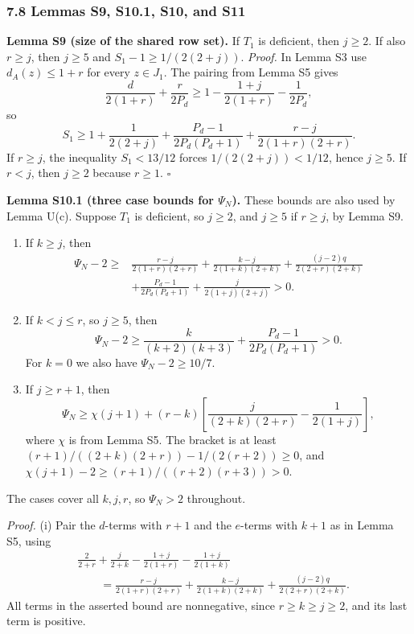 \subsubsection*{7.8 Lemmas S9, S10.1, S10, and S11}
\textbf{Lemma S9 (size of the shared row set).} If $T_1$ is deficient, then $j\ge2$. If also $r\ge j$, then $j\ge5$ and $S_1-1\ge1/(2(2+j))$.
\emph{Proof.} In Lemma S3 use $d_A(z)\le1+r$ for every $z\in J_1$. The pairing from Lemma S5 gives
\[
 \frac d{2(1+r)}+\frac r{2P_d}\ge1-\frac{1+j}{2(1+r)}-\frac1{2P_d},
\]
so
\[
 S_1\ge1+\frac1{2(2+j)}+\frac{P_d-1}{2P_d(P_d+1)}
                   +\frac{r-j}{2(1+r)(2+r)}.
\]
If $r\ge j$, the inequality $S_1<13/12$ forces $1/(2(2+j))<1/12$, hence $j\ge5$. If $r<j$, then $j\ge2$ because $r\ge1$. \hfill$\square$

\textbf{Lemma S10.1 (three case bounds for $\Psi_N$).} These bounds are also used by Lemma U(c). Suppose $T_1$ is deficient, so $j\ge2$, and $j\ge5$ if $r\ge j$, by Lemma S9.
\begin{enumerate}
\item[(i)] If $k\ge j$, then
\[
\begin{aligned}
 \Psi_N-2\ge{}&\frac{r-j}{2(1+r)(2+r)}+\frac{k-j}{2(1+k)(2+k)}
              +\frac{(j-2)q}{2(2+r)(2+k)}\\
 &+\frac{P_d-1}{2P_d(P_d+1)}+\frac j{2(1+j)(2+j)}>0.
\end{aligned}
\]
\item[(ii)] If $k<j\le r$, so $j\ge5$, then
\[
 \Psi_N-2\ge\frac k{(k+2)(k+3)}+\frac{P_d-1}{2P_d(P_d+1)}>0.
\]
For $k=0$ we also have $\Psi_N-2\ge10/7$.
\item[(iii)] If $j\ge r+1$, then
\[
 \Psi_N\ge\chi(j+1)+(r-k)\left[\frac j{(2+k)(2+r)}-\frac1{2(1+j)}\right],
\]
where $\chi$ is from Lemma S5. The bracket is at least
$ (r+1)/((2+k)(2+r))-1/(2(r+2))\ge0$, and
$\chi(j+1)-2\ge(r+1)/((r+2)(r+3))>0$.
\end{enumerate}
The cases cover all $k,j,r$, so $\Psi_N>2$ throughout.

\emph{Proof.} (i) Pair the $d$-terms with $r+1$ and the $e$-terms with $k+1$ as in Lemma S5, using
\[
\begin{aligned}
 &\frac2{2+r}+\frac j{2+k}-\frac{1+j}{2(1+r)}-\frac{1+j}{2(1+k)}\\
 &\qquad=\frac{r-j}{2(1+r)(2+r)}+\frac{k-j}{2(1+k)(2+k)}
              +\frac{(j-2)q}{2(2+r)(2+k)}.
\end{aligned}
\]
All terms in the asserted bound are nonnegative, since $r\ge k\ge j\ge2$, and its last term is positive.

